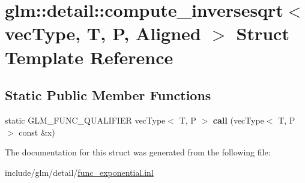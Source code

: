 \hypertarget{structglm_1_1detail_1_1compute__inversesqrt}{}\section{glm\+:\+:detail\+:\+:compute\+\_\+inversesqrt$<$ vec\+Type, T, P, Aligned $>$ Struct Template Reference}
\label{structglm_1_1detail_1_1compute__inversesqrt}
\subsection*{Static Public Member Functions}
\begin{DoxyCompactItemize}
\item 
\mbox{\label{structglm_1_1detail_1_1compute__inversesqrt_ae406dd2e5f5cd17e99ad85e21ae0ae5a}} 
static G\+L\+M\+\_\+\+F\+U\+N\+C\+\_\+\+Q\+U\+A\+L\+I\+F\+I\+ER vec\+Type$<$ T, P $>$ {\bfseries call} (vec\+Type$<$ T, P $>$ const \&x)
\end{DoxyCompactItemize}


The documentation for this struct was generated from the following file\+:\begin{DoxyCompactItemize}
\item 
include/glm/detail/\hyperlink{func__exponential_8inl}{func\+\_\+exponential.\+inl}\end{DoxyCompactItemize}
